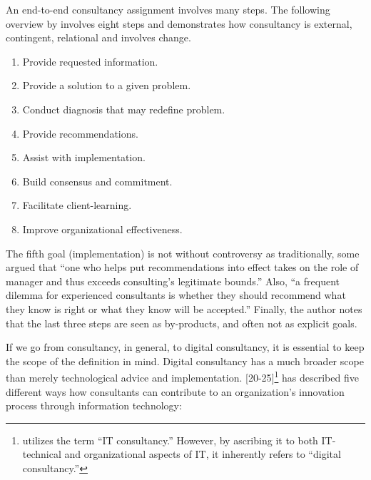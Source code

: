 \documentclass[12pt]{article}
\providecommand{\tightlist}{%
  \setlength{\itemsep}{0pt}\setlength{\parskip}{0pt}}
\begin{document}
An end-to-end consultancy assignment involves many steps. The following
overview by \citet{turner1982} involves eight steps and demonstrates how
consultancy is external, contingent, relational and involves change.

\begin{enumerate}
\def\labelenumi{\arabic{enumi}.}
\tightlist
\item
  Provide requested information.
\item
  Provide a solution to a given problem.
\item
  Conduct diagnosis that may redefine problem.
\item
  Provide recommendations.
\item
  Assist with implementation.
\item
  Build consensus and commitment.
\item
  Facilitate client-learning.
\item
  Improve organizational effectiveness.
\end{enumerate}

The fifth goal (implementation) is not without controversy as
traditionally, some argued that ``one who helps put recommendations into
effect takes on the role of manager and thus exceeds consulting's
legitimate bounds.'' \citep{turner1982} Also, ``a frequent dilemma for
experienced consultants is whether they should recommend what they know
is right or what they know will be accepted.'' Finally, the author notes
that the last three steps are seen as by-products, and often not as
explicit goals.

If we go from consultancy, in general, to digital consultancy, it is
essential to keep the scope of the definition in mind. Digital
consultancy has a much broader scope than merely technological advice
and implementation. \citet{swanson2010} {[}20-25{]}\footnote{\citet{swanson2010}
  utilizes the term ``IT consultancy.'' However, by ascribing it to both
  IT-technical and organizational aspects of IT, it inherently refers to
  ``digital consultancy.''} has described five different ways how
consultants can contribute to an organization's innovation process
through information technology:
\end{document}
